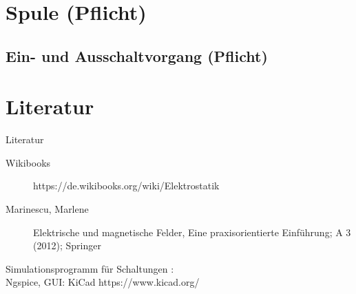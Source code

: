 \documentclass[aspectratio=169, ignorenonframetext]{beamer}
\begin{document}
\section[Spule]{Spule (Pflicht)}

\subsection{Ein- und Ausschaltvorgang (Pflicht)}


\section{Literatur}
\begin{frame}{Literatur}
\begin{description}
  \item[Wikibooks] https://de.wikibooks.org/wiki/Elektrostatik
  \item[Marinescu, Marlene]  Elektrische und magnetische Felder,
  Eine praxisorientierte Einführung; A 3 (2012); Springer
\end{description}
Simulationsprogramm für Schaltungen :\\Ngspice, GUI: KiCad https://www.kicad.org/
\end{frame}

  \listoffigures


  \label{LastPage}
\end{document}

